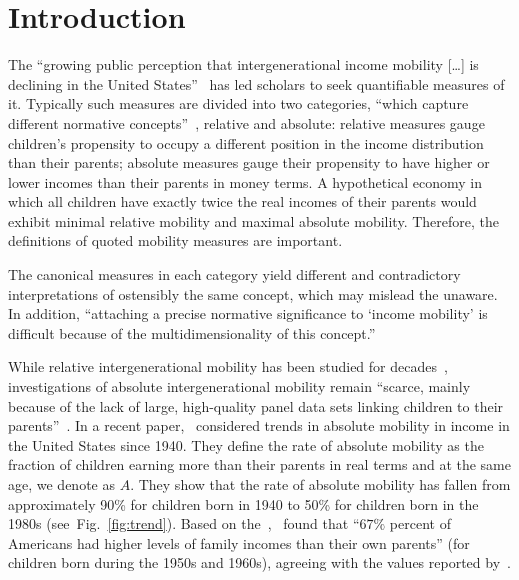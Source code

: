 \documentclass[12pt]{article}
\newcommand{\fref}[1]{Fig.~\ref{fig:#1}}
\numberwithin{equation}{section}
\begin{document}
\doublespacing

\section{Introduction} \label{sec:introduction}

The ``growing public perception that intergenerational income mobility [\ldots] is declining in the United States''~\citep[p.~141]{chetty2014united} has led scholars to seek quantifiable measures of it. Typically such measures are divided into two categories, ``which capture different normative concepts''~\citep[p.~1560]{chetty2014land}, relative and absolute: relative measures gauge children's propensity to occupy a different position in the income distribution than their parents; absolute measures gauge their propensity to have higher or lower incomes than their parents in money terms. A hypothetical economy in which all children have exactly twice the real incomes of their parents would exhibit minimal relative mobility and maximal absolute mobility. Therefore, the definitions of quoted mobility measures are important.

The canonical measures in each category yield different and contradictory interpretations of ostensibly the same concept, which may mislead the unaware. In addition, ``attaching a precise normative significance to `income mobility' is difficult because of the multidimensionality of this concept.''~\citep[p.~588]{fields1999measurement}

While relative intergenerational mobility has been studied for decades~\citep{becker1979equilibrium,borjas1992ethnic,piketty2000theories,mazumder2005fortunate,aaronson2008intergenerational,lee2009trends,hauser2010intergenerational,corak2013income,chetty2014united,berman2016understanding}, investigations of absolute intergenerational mobility remain ``scarce, mainly because of the lack of large, high-quality panel data sets linking children to their parents''~\citep[p.~398]{chetty2017fading}. In a recent paper,~\citet{chetty2017fading} considered trends in absolute mobility in income in the United States since 1940. They define the rate of absolute mobility as the fraction of children earning more than their parents in real terms and at the same age, we denote as $A$. They show that the rate of absolute mobility has fallen from approximately 90\% for children born in 1940 to 50\% for children born in the 1980s (see~\fref{trend}). Based on the~\citet{PSID2017},~\citet{isaacs2007economic} found that ``$67\%$ percent of Americans had higher levels of family incomes than their own parents'' (for children born during the 1950s and 1960s), agreeing with the values reported by~\citet{chetty2017fading}.
\end{document}
